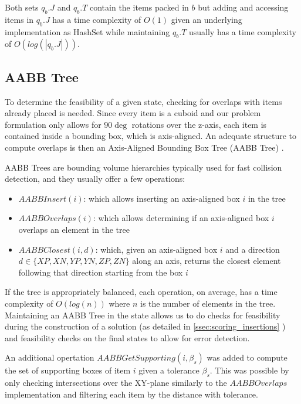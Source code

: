 Both sets $q_b.J$ and $q_b.T$ contain the items packed in $b$ but adding and accessing items in $q_b.J$ has a time complexity of $O(1)$ given an underlying implementation as HashSet while maintaining $q_b.T$ usually has a time complexity of $O(log(|q_b.J|))$.

\subsection{AABB Tree}
\label{sec:problem_state:aabbtree}%

To determine the feasibility of a given state, checking for overlaps with items already placed is needed.
Since every item is a cuboid and our problem formulation only allows for $90\deg$ rotations over the z-axis, each item is contained inside a bounding box, which is axis-aligned.
An adequate structure to compute overlaps is then an Axis-Aligned Bounding Box Tree (AABB Tree) \cite{bergen1997efficient}.

AABB Trees are bounding volume hierarchies typically used for fast collision detection, and they usually offer a few operations:
\begin{itemize}
    \item $AABBInsert(i)$: which allows inserting an axis-aligned box $i$ in the tree
    \item $AABBOverlaps(i)$: which allows determining if an axis-aligned box $i$ overlaps an element in the tree
    \item $AABBClosest(i, d)$: which, given an axis-aligned box $i$ and a direction \\$d \in \{ XP, XN, YP, YN, ZP, ZN \}$ along an axis, returns the closest element following that direction starting from the box $i$
\end{itemize}

If the tree is appropriately balanced, each operation, on average, has a time complexity of $O(log(n))$ where $n$ is the number of elements in the tree.
Maintaining an AABB Tree in the state allows us to do checks for feasibility during the construction of a solution (as detailed in \ref{ssec:scoring_insertions} ) and feasibility checks on the final states to allow for error detection.

\label{aabb:get_supporting}%
An additional opertation $AABBGetSupporting(i, \beta_s)$ was added to compute the set of supporting boxes of item $i$ given a tolerance $\beta_s$.
This was possible by only checking intersections over the XY-plane similarly to the $AABBOverlaps$ implementation and filtering each item by the distance with tolerance.


